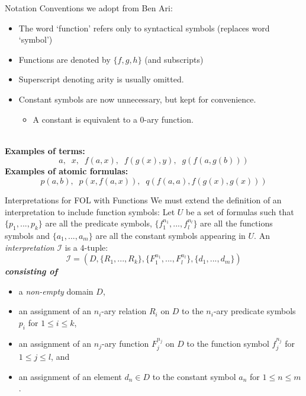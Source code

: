 \documentclass[style=sailor,size=12pt,mode=present]{powerdot}
\theoremstyle{definition}
\newenvironment{defn}[1]
  {\renewcommand\theinnerdefn{#1}\innerdefn}
  {\endinnerdefn}
\begin{document}
\begin{wideslide}[bm=,toc=]{Notation}
Conventions we adopt from Ben Ari:
\begin{itemize}
\item The word `function' refers only to syntactical symbols (replaces word `symbol') 
\item Functions are denoted by $\{f,g,h\}$ (and subscripts)
\item Superscript denoting arity is usually omitted.
\item Constant symbols are now unnecessary, but kept for convenience.
\begin{itemize}
\item A constant is equivalent to a $0$-ary function.
\end{itemize}
\end{itemize}
~\\
{\bf Examples of terms:}
\[
  a,\;\; x,\;\; f(a,x),\;\; f(g(x),y),\;\; g(f(a,g(b)))
  \]
{\bf Examples of atomic formulas:}
\[
  p(a,b),\;\; p(x,f(a,x)),\;\; q(f(a,a), f(g(x),g(x)))
\]
\end{wideslide}

\begin{wideslide}[bm=,toc=]{Interpretations for FOL with Functions}
We must extend the definition of an interpretation to include function symbols:
\begin{defn}{9.3}[Ben Ari]
Let $U$ be a set of formulas such that $\{p_1,...,p_k\}$ are all the predicate
symbols, $\{f_1^{n_1},...,f_l^{n_l}\}$ are all the functions symbols and
$\{a_1,...,a_m\}$ are all the constant symbols appearing in $U$. An
\emph{interpretation} $\mathcal{I}$ is a $4$-tuple:
\[
  \mathcal{I} = (D, \{R_1,...,R_k\}, \{F_1^{n_1},...,F_l^{n_l}\},\{d_1,...,d_m\})
  \]
{\bf \emph{consisting of}}
\end{defn}
\vspace{-3ex}
\begin{itemize}
\item<2-> a \emph{non-empty} domain $D$,
\item<3-> an assignment of an $n_i$-ary relation $R_i$ on $D$ to the $n_i$-ary predicate 
      symbols $p_i$ for $1 \leq i \leq k$, 
\item<4-> an assignment of an $n_j$-ary function $F_j^{n_j}$ on $D$ to the
      function symbol $f_j^{n_j}$ for $1 \leq j \leq l$, and 
\item<5-> an assignment of an element $d_n \in D$ to the constant symbol $a_n$ for $1 \leq n \leq m$.
\end{itemize}
\end{wideslide}
\end{document}
